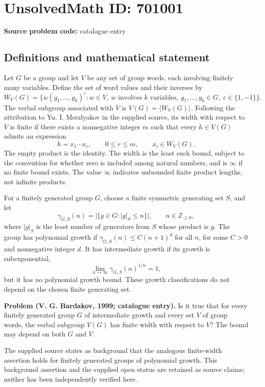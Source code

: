 \documentclass[11pt]{article}
\begin{document}
\section*{UnsolvedMath ID: 701001}
\textbf{Source problem code:} catalogue entry
\subsection{Definitions and mathematical statement}
Let \(G\) be a group and let \(V\) be any set of group words, each involving finitely many variables. Define the set of word values and their inverses by
\[
W_V(G)=\{w(g_1,\ldots,g_k)^{\varepsilon}: w\in V,\ w\text{ involves }k\text{ variables},\ g_1,\ldots,g_k\in G,\ \varepsilon\in\{1,-1\}\}.
\]
The verbal subgroup associated with \(V\) is \(V(G)=\langle W_V(G)\rangle\). Following the attribution to Yu. I. Merzlyakov in the supplied source, its width with respect to \(V\) is finite if there exists a nonnegative integer \(m\) such that every \(h\in V(G)\) admits an expression
\[
h=x_1\cdots x_r,\qquad 0\le r\le m,\qquad x_i\in W_V(G).
\]
The empty product is the identity. The width is the least such bound, subject to the convention for whether zero is included among natural numbers, and is \(\infty\) if no finite bound exists. The value \(\infty\) indicates unbounded finite product lengths, not infinite products.

For a finitely generated group \(G\), choose a finite symmetric generating set \(S\), and let
\[
\gamma_{G,S}(n)=\bigl|\{g\in G: |g|_S\le n\}\bigr|,\qquad n\in\mathbb Z_{\ge0},
\]
where \(|g|_S\) is the least number of generators from \(S\) whose product is \(g\). The group has polynomial growth if \(\gamma_{G,S}(n)\le C(n+1)^d\) for all \(n\), for some \(C>0\) and nonnegative integer \(d\). It has intermediate growth if its growth is subexponential,
\[
\lim_{n\to\infty}\gamma_{G,S}(n)^{1/n}=1,
\]
but it has no polynomial growth bound. These growth classifications do not depend on the chosen finite generating set.

\textbf{Problem (V. G. Bardakov, 1999; catalogue entry).} Is it true that for every finitely generated group \(G\) of intermediate growth and every set \(V\) of group words, the verbal subgroup \(V(G)\) has finite width with respect to \(V\)? The bound may depend on both \(G\) and \(V\).

The supplied source states as background that the analogous finite-width assertion holds for finitely generated groups of polynomial growth. This background assertion and the supplied open status are retained as source claims; neither has been independently verified here.
\end{document}
